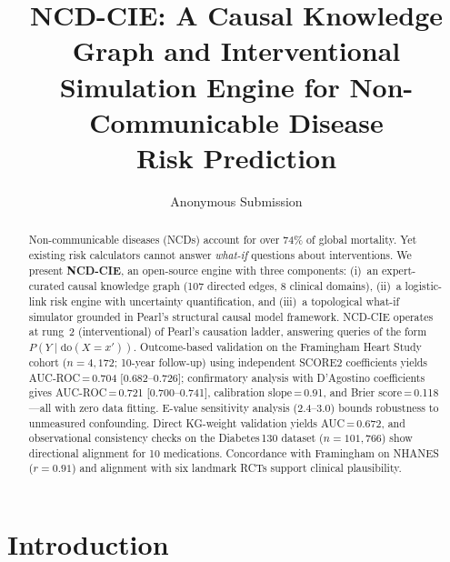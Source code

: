 \documentclass[runningheads]{llncs}
\begin{document}
\title{NCD-CIE: A Causal Knowledge Graph and Interventional\\Simulation Engine for Non-Communicable Disease\\Risk Prediction}

\author{Anonymous Submission}

\maketitle

\begin{abstract}
Non-communicable diseases (NCDs) account for over 74\% of global
mortality.
Yet existing risk calculators cannot answer \emph{what-if} questions
about interventions.
We present \textbf{NCD-CIE}, an open-source engine with three
components:
(i)~an expert-curated causal knowledge graph (107 directed edges,
8 clinical domains),
(ii)~a logistic-link risk engine with uncertainty quantification, and
(iii)~a topological what-if simulator grounded in Pearl's structural
causal model framework.
NCD-CIE operates at rung~2 (interventional) of Pearl's causation
ladder, answering queries of the form
$P(Y \mid \mathrm{do}(X\!=\!x'))$.
Outcome-based validation on the Framingham Heart Study cohort
($n\!=\!4{,}172$; 10-year follow-up) using independent SCORE2
coefficients yields AUC-ROC\,=\,0.704 [0.682--0.726]; confirmatory
analysis with D'Agostino coefficients gives
AUC-ROC\,=\,0.721 [0.700--0.741],
calibration slope\,=\,0.91, and Brier score\,=\,0.118---all with
zero data fitting.
E-value sensitivity analysis (2.4--3.0) bounds robustness to
unmeasured confounding.
Direct KG-weight validation yields AUC\,=\,0.672, and
observational consistency checks on the Diabetes\,130 dataset
($n\!=\!101{,}766$) show directional alignment for 10 medications.
Concordance with Framingham on NHANES ($r\!=\!0.91$) and alignment
with six landmark RCTs support clinical plausibility.

\end{abstract}

\section{Introduction}\label{sec:intro}
\end{document}
